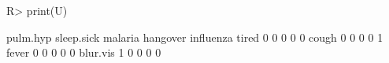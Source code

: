 \begin{Schunk}
% --begin: "comp.u"
\begin{Sinput}
R> print(U)
\end{Sinput}
\begin{Soutput}
         pulm.hyp sleep.sick malaria hangover influenza
tired           0          0       0        0         0
cough           0          0       0        0         1
fever           0          0       0        0         0
blur.vis        1          0       0        0         0
\end{Soutput}
%
% --end: "comp.u"
\end{Schunk}
